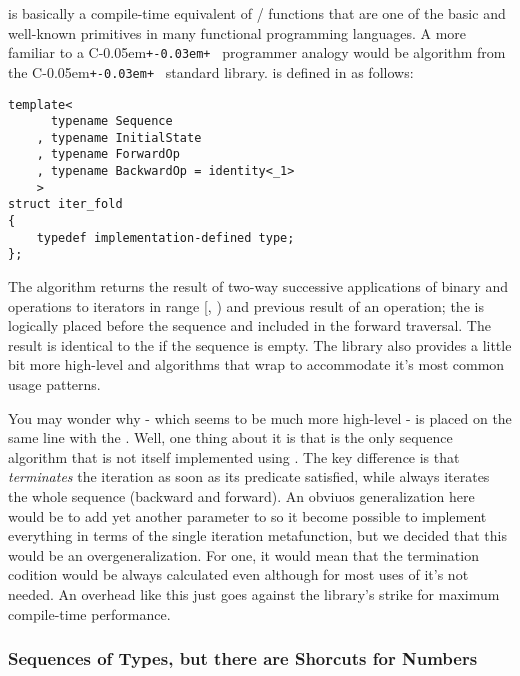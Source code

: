 \documentclass{netobjectdays}
\newcommand{\Cpp}{C\kern-0.05em\texttt{+\kern-0.03em+}%
}
\begin{document}
 is basically a compile-time equivalent of 
/ functions that are one of the basic 
and well-known primitives in many functional programming 
languages. A more familiar to a \Cpp\ programmer analogy would 
be  algorithm from the \Cpp\ standard 
library.  is defined in  
as follows:

{\footnotesize
\begin{verbatim}
template<
      typename Sequence
    , typename InitialState
    , typename ForwardOp
    , typename BackwardOp = identity<_1>
    >
struct iter_fold
{
    typedef implementation-defined type;
};
\end{verbatim}
}

The algorithm returns the result of two-way successive 
applications of binary  and 
operations to iterators in range 
[, ) 
and previous result of an operation; 
the  is logically placed before the 
sequence and included in the forward traversal. The result 
 is identical to the  if the 
sequence is empty. 
The library also provides a little bit more high-level 
 and  algorithms that wrap 
 to accommodate it's most common usage 
patterns.

You may wonder why  - which seems to be much 
more high-level - is placed on the same line with the 
. Well, one thing about it is that 
 is the only sequence algorithm that is not 
itself implemented using . The key difference 
is that  \emph{terminates} the iteration as 
soon as its predicate satisfied, while  
always iterates the whole sequence (backward and forward). 
An obviuos generalization here would be to add yet another 
parameter to  so it become possible to 
implement everything in terms of the single iteration 
metafunction, but we decided that this would be an 
overgeneralization. For one, it would mean that the 
termination codition would be always calculated even 
although for most uses of  it's not needed. 
An overhead like this just goes against the library's strike 
for maximum compile-time performance.


\subsubsection{Sequences of Types, but there are Shorcuts for Numbers}
\end{document}
